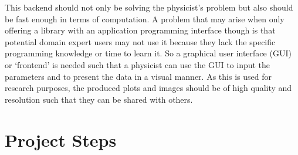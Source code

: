 This backend should not only be solving the physicist's problem but also should
be fast enough in terms of computation. A problem that may arise when only
offering a library with an application programming interface though is that
potential domain expert users may not use it because they lack the specific
programming knowledge or time to learn it. So a graphical user interface (GUI)
or `frontend' is needed such that a physicist can use the GUI to input the
parameters and to present the data in a visual manner. As this is used for
research purposes, the produced plots and images should be of high quality and
resolution such that they can be shared with others.




\section{Project Steps}
\label{sec:steps}

